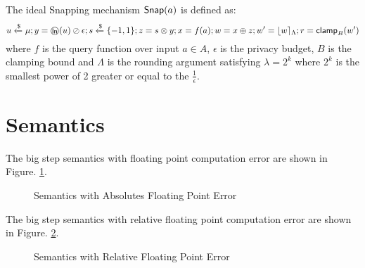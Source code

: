 \documentclass[a4paper,11pt]{article}
\begin{document}
\begin{defn}
The ideal Snapping mechanism $\mathsf{Snap}( a)$ is defined as:
\[
	u \xleftarrow{\$} \edistr; y = \oln (u) \oslash \epsilon; s \samplel \{-1, 1\}; z = s \otimes y; x = f(a); w = x \oplus z; w' = \round{w}_{\Lambda}; r = \clamp_B (w')
\]
where $f$ is the query function over input $a \in A$, $\epsilon$ is the privacy budget, $B$ is the clamping bound and $\Lambda$ is the rounding argument satisfying $\lambda = 2^k$ where $2^k$ is the smallest power of 2 greater or equal to the $\frac{1}{\epsilon}$.
\end{defn}

\section{Semantics}
The big step semantics with floating point computation error are shown in Figure. \ref{fig_semantics_abs}.
\begin{figure}
\caption{Semantics with Absolutes Floating Point Error}
\label{fig_semantics_abs}
\end{figure}

The big step semantics with relative floating point computation error are shown in Figure. \ref{fig_semantics_rel}.
\begin{figure}
\caption{Semantics with Relative Floating Point Error}
\label{fig_semantics_rel}
\end{figure}
\end{document}
